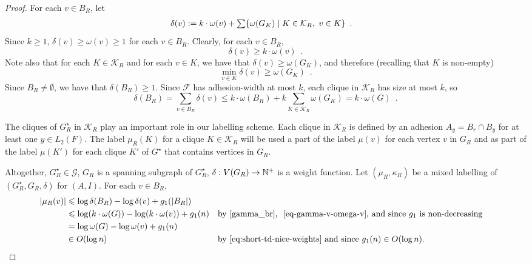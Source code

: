 \documentclass{patmorin}
\let\eqref\cref
\renewcommand{\ge}{\geqslant}
\renewcommand{\le}{\leqslant}
\renewcommand{\geq}{\geqslant}
\newcommand{\Oh}{O}
\DeclarePairedDelimiter{\set}{\{}{\}}
\newcommand{\calF}{\mathcal{F}}
\newcommand{\calG}{\mathcal{G}}
\newcommand{\calK}{\mathcal{K}}
\begin{document}
\begin{proof}
  For each $v\in B_R$, let
  \begin{align*}
    \delta(v)
     & :=k\cdot\omega(v)+\textstyle\sum\set{\omega(G_K)\mid K\in\calK_R,\ v\in K} \enspace .
  \end{align*}
  Since $k\geq1$, $\delta(v)\geq\omega(v)\geq 1$ for each $v\in B_R$.
  Clearly, for each $v\in B_R$,
  \begin{equation}
    \label{eq-gamma-v-omega-v}
    \delta(v) \geq k\cdot\omega(v)\enspace.
  \end{equation}
  Note also that for each $K\in\calK_R$ and for each $v\in K$, we have that $\delta(v)\ge \omega(G_K)$, and therefore (recalling that $K$ is non-empty)
  \begin{equation}
    \min_{v\in K}\delta(v) \ge \omega(G_K) \enspace . \label{gamma_v_lower_bound}
  \end{equation}
  Since $B_R\neq\emptyset$, we have that $\delta(B_R)\geq1$.
  Since $\calF$ has adhesion-width at most $k$, each clique in $\calK_R$ has size at most $k$, so
  \begin{equation}
    \delta(B_R)=\sum_{v\in B_R}\delta(v)
    \le k\cdot\omega(B_R) + k\sum_{K\in\calK_R}\omega(G_K)
    = k\cdot\omega(G)  \enspace . \label{gamma_br}
  \end{equation}

  The cliques of $G^\star_R$ in $\calK_R$ play an important role in our labelling scheme.
  Each clique in $\calK_R$ is defined by an adhesion $A_y=B_r\cap B_y$ for at least one $y\in L_2(F)$.  The label $\mu_R(K)$ for a clique $K\in\calK_R$ will be used a part of the label $\mu(v)$ for each vertex $v$ in $G_R$ and as part of the label $\mu(K')$ for each clique $K'$ of $G^\star$ that contains vertices in $G_R$.

  Altogether, $G^\star_R\in\calG$, $G_R$ is a spanning subgraph of $G^\star_R$, $\delta:V(G_R)\to\mathbb{N}^+$ is a weight function. Let $(\mu_R,\kappa_R)$ be a mixed labelling of $(G^\star_R, G_R, \delta)$ for $(A, I)$. For each $v\in B_R$,
  \begin{align}
    |\mu_R(v)|
     & \le \log \delta(B_R)-\log\delta(v)+g_1(|B_R|)\notag                                                                                                                              \\
     & \le \log (k\cdot\omega(G)) - \log (k\cdot\omega(v)) + g_1(n)             &  & \textrm{by~\eqref{gamma_br}, ~\eqref{eq-gamma-v-omega-v}, and since $g_1$ is non-decreasing}\notag \\
     & = \log\omega(G) - \log\omega(v) + g_1(n)\label{eq:mu-R-bounded-in-omega}                                                                                                         \\
     & \in\Oh(\log n)                                                           &  & \textrm{by~\eqref{eq:short-td-nice-weights} and since $g_1(n)\in\Oh(\log n)$.}
    \label{eq:mu-R-in-logn}
  \end{align}


\end{proof}
\end{document}

